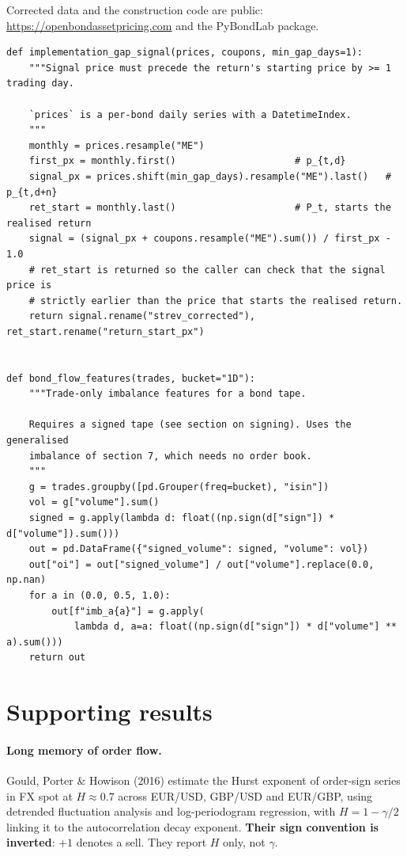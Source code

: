 \documentclass[11pt]{article}
\begin{document}
Corrected data and the construction code are public:
\url{https://openbondassetpricing.com} and the PyBondLab package.

\begin{lstlisting}[caption={Implementation gap and a signed bond tape.}]
def implementation_gap_signal(prices, coupons, min_gap_days=1):
    """Signal price must precede the return's starting price by >= 1 trading day.

    `prices` is a per-bond daily series with a DatetimeIndex.
    """
    monthly = prices.resample("ME")
    first_px = monthly.first()                     # p_{t,d}
    signal_px = prices.shift(min_gap_days).resample("ME").last()   # p_{t,d+n}
    ret_start = monthly.last()                     # P_t, starts the realised return
    signal = (signal_px + coupons.resample("ME").sum()) / first_px - 1.0
    # ret_start is returned so the caller can check that the signal price is
    # strictly earlier than the price that starts the realised return.
    return signal.rename("strev_corrected"), ret_start.rename("return_start_px")


def bond_flow_features(trades, bucket="1D"):
    """Trade-only imbalance features for a bond tape.

    Requires a signed tape (see section on signing). Uses the generalised
    imbalance of section 7, which needs no order book.
    """
    g = trades.groupby([pd.Grouper(freq=bucket), "isin"])
    vol = g["volume"].sum()
    signed = g.apply(lambda d: float((np.sign(d["sign"]) * d["volume"]).sum()))
    out = pd.DataFrame({"signed_volume": signed, "volume": vol})
    out["oi"] = out["signed_volume"] / out["volume"].replace(0.0, np.nan)
    for a in (0.0, 0.5, 1.0):
        out[f"imb_a{a}"] = g.apply(
            lambda d, a=a: float((np.sign(d["sign"]) * d["volume"] ** a).sum()))
    return out
\end{lstlisting}

\section{Supporting results}\label{sec:support}

\paragraph{Long memory of order flow.} Gould, Porter \& Howison (2016) estimate
the Hurst exponent of order-sign series in FX spot at $H\approx0.7$ across
EUR/USD, GBP/USD and EUR/GBP, using detrended fluctuation analysis and
log-periodogram regression, with $H=1-\gamma/2$ linking it to the
autocorrelation decay exponent. \textbf{Their sign convention is inverted}:
$+1$ denotes a sell. They report $H$ only, not $\gamma$.
\end{document}
